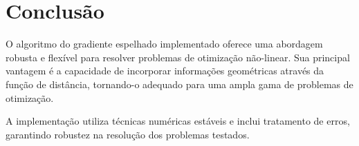 \documentclass[12pt]{article}
\begin{document}
\section{Conclusão}

O algoritmo do gradiente espelhado implementado oferece uma abordagem robusta e flexível para resolver problemas de otimização não-linear. Sua principal vantagem é a capacidade de incorporar informações geométricas através da função de distância, tornando-o adequado para uma ampla gama de problemas de otimização.

A implementação utiliza técnicas numéricas estáveis e inclui tratamento de erros, garantindo robustez na resolução dos problemas testados.
\end{document}
